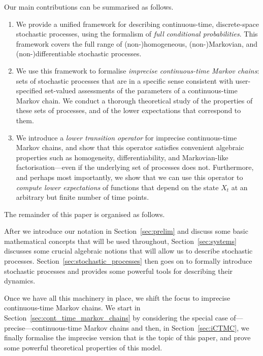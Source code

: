 \documentclass[10pt,a4paper]{paper}
\theoremstyle{definition}
\begin{document}
Our main contributions can be summarised as follows.
\begin{enumerate}
\item We provide a unified framework for describing continuous-time, discrete-space stochastic processes, using the formalism of \emph{full conditional probabilities}. This framework covers the full range of (non-)homogeneous, (non-)Markovian, and (non-)differentiable stochastic processes.
\item We use this framework to formalise \emph{imprecise continuous-time Markov chains}: sets of stochastic processes that are in a specific sense consistent with user-specified set-valued assessments of the parameters of a continuous-time Markov chain. We conduct a thorough theoretical study of the properties of these sets of processes, and of the lower expectations that correspond to them. 
\item We introduce a \emph{lower transition operator} for imprecise continuous-time Markov chains, and show that this operator satisfies convenient algebraic properties such as homogeneity, differentiability, and Markovian-like factorisation---even if the underlying set of processes does not. Furthermore, and perhaps most importantly, we show that we can use this operator to \emph{compute lower expectations} of functions that depend on the state $X_t$ at an arbitrary but finite number of time points.%
\end{enumerate}

The remainder of this paper is organised as follows. 

After we  introduce our notation in Section~\ref{sec:prelim} and discuss some basic mathematical concepts that will be used throughout, Section~\ref{sec:systems} discusses some crucial algebraic notions that will allow us to describe stochastic processes. Section~\ref{sec:stochastic_processes} then goes on to formally introduce stochastic processes and provides some powerful tools for describing their dynamics.


Once we have all this machinery in place, we shift the focus to imprecise continuous-time Markov chains. We start in Section~\ref{sec:cont_time_markov_chains} by considering the special case of---precise---continuous-time Markov chains and then, in Section~\ref{sec:iCTMC}, we finally formalise the imprecise version that is the topic of this paper, and prove some powerful theoretical properties of this model.
\end{document}

